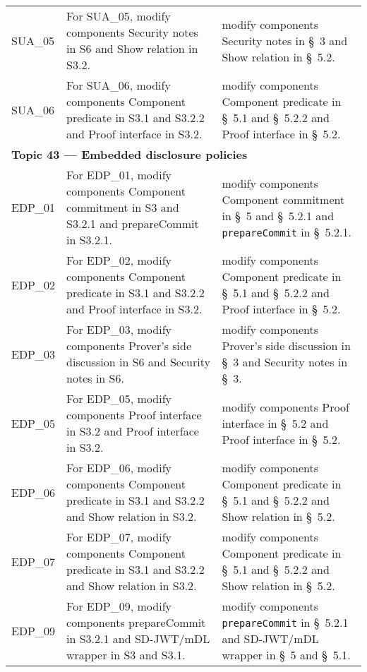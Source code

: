 \begin{landscape}
\begin{longtable}{p{3cm} p{10cm} p{7cm}}
SUA\_05 &
For SUA\_05, modify components Security notes in S6 and Show relation in S3.2. &
modify components Security notes in \S~3 and Show relation in \S~5.2. \\

SUA\_06 &
For SUA\_06, modify components Component predicate in S3.1 and S3.2.2 and Proof interface in S3.2. &
modify components Component predicate in \S~5.1 and \S~5.2.2 and Proof interface in \S~5.2. \\[1em]


\multicolumn{3}{l}{\textbf{Topic 43 — Embedded disclosure policies}}\\

EDP\_01 &
For EDP\_01, modify components Component commitment in S3 and S3.2.1 and prepareCommit in S3.2.1. &
modify components Component commitment in \S~5 and \S~5.2.1 and \texttt{prepareCommit} in \S~5.2.1. \\

EDP\_02 &
For EDP\_02, modify components Component predicate in S3.1 and S3.2.2 and Proof interface in S3.2. &
modify components Component predicate in \S~5.1 and \S~5.2.2 and Proof interface in \S~5.2. \\

EDP\_03 &
For EDP\_03, modify components Prover's side discussion in S6 and Security notes in S6. &
modify components Prover's side discussion in \S~3 and Security notes in \S~3. \\

EDP\_05 &
For EDP\_05, modify components Proof interface in S3.2 and Proof interface in S3.2. &
modify components Proof interface in \S~5.2 and Proof interface in \S~5.2. \\

EDP\_06 &
For EDP\_06, modify components Component predicate in S3.1 and S3.2.2 and Show relation in S3.2. &
modify components Component predicate in \S~5.1 and \S~5.2.2 and Show relation in \S~5.2. \\

EDP\_07 &
For EDP\_07, modify components Component predicate in S3.1 and S3.2.2 and Show relation in S3.2. &
modify components Component predicate in \S~5.1 and \S~5.2.2 and Show relation in \S~5.2. \\

EDP\_09 &
For EDP\_09, modify components prepareCommit in S3.2.1 and SD-JWT/mDL wrapper in S3 and S3.1. &
modify components \texttt{prepareCommit} in \S~5.2.1 and SD-JWT/mDL wrapper in \S~5 and \S~5.1. \\


\end{longtable}
\end{landscape}
